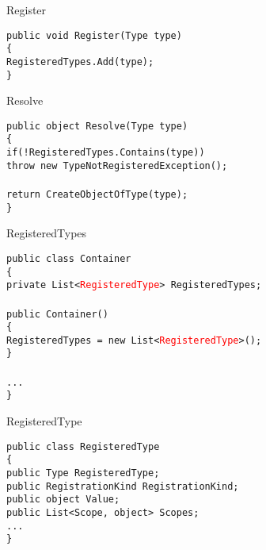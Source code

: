 \documentclass{beamer}
\newcommand{\code}[1]{{\texttt{#1}}}
\begin{document}
\begin{frame}{Register}
     \begin{large}
	\code{public void Register(Type type)}\\
	\code{\{}\\ \quad
		\code{RegisteredTypes.Add(type);}\\
	\code{\}}
     \end{large}
\end{frame}

\begin{frame}{Resolve}
     \begin{large}
	\code{public object Resolve(Type type)}\\
	\code{\{}\\ \quad
		\code{if(!RegisteredTypes.Contains(type))}\\ \qquad
		\code{throw new TypeNotRegisteredException();}\\ \quad
		\code{}\\ \quad
		\code{return CreateObjectOfType(type);}\\
	\code{\}}
     \end{large}
\end{frame}

\begin{frame}{RegisteredTypes}
     \begin{large}
	\code{public class Container}\\
	\code{\{}\\ \quad
		\code{private List<\textcolor{red}{RegisteredType}> RegisteredTypes;}\\ \quad
		\code{}\\ \quad
		\code{public Container()}\\ \quad
		\code{\{}\\ \qquad
		\code{RegisteredTypes = new List<\textcolor{red}{RegisteredType}>();}\\ \quad
		\code{\}}\\  \quad
		\code{}\\ \quad
		\code{...}\\
	\code{\}}
     \end{large}
\end{frame}

\begin{frame}{RegisteredType}
     \begin{large}
	\code{public class RegisteredType}\\
	\code{\{}\\ \quad
		\code{public Type RegisteredType;}\\ \quad
		\code{public RegistrationKind RegistrationKind;}\\ \quad
		\code{public object Value;}\\ \quad
		\code{public List<Scope, object> Scopes;}\\ \quad
		\code{...}\\
	\code{\}}
     \end{large}
\end{frame}
\end{document}
